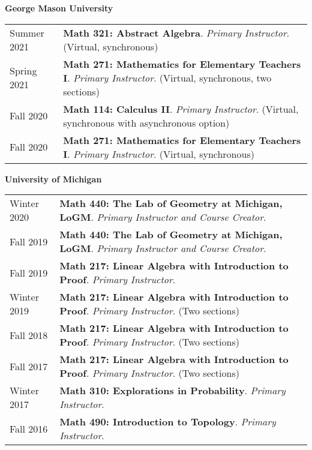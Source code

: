 
    \medskip


    \medskip
    \medskip

    \textbf{\large George Mason University}
    
    \begin{center}
    {
    \renewcommand{\arraystretch}{1.2}
    \begin{longtable}{p{}  p{}}
      Summer 2021 & \textbf{{\normalfont Math 321:} Abstract Algebra}. \textit{Primary Instructor}. (Virtual, synchronous) \\ 
  Spring 2021 & \textbf{{\normalfont Math 271:} Mathematics for Elementary Teachers I}. \textit{Primary Instructor}. (Virtual, synchronous, two sections) \\ 
  Fall 2020 & \textbf{{\normalfont Math 114:} Calculus II}. \textit{Primary Instructor}. (Virtual, synchronous with asynchronous option) \\ 
  Fall 2020 & \textbf{{\normalfont Math 271:} Mathematics for Elementary Teachers I}. \textit{Primary Instructor}. (Virtual, synchronous) 
    \end{longtable}
    } 
    \end{center}

    \vspace{-1em}


    \textbf{\large University of Michigan}
    
    \begin{center}
    {
    \renewcommand{\arraystretch}{1.2}
    \begin{longtable}{p{}  p{}}
      Winter 2020 & \textbf{{\normalfont Math 440:} The Lab of Geometry at Michigan, LoGM}. \textit{Primary Instructor and Course Creator}.  \\ 
  Fall 2019 & \textbf{{\normalfont Math 440:} The Lab of Geometry at Michigan, LoGM}. \textit{Primary Instructor and Course Creator}.  \\ 
  Fall 2019 & \textbf{{\normalfont Math 217:} Linear Algebra with Introduction to Proof}. \textit{Primary Instructor}.  \\ 
  Winter 2019 & \textbf{{\normalfont Math 217:} Linear Algebra with Introduction to Proof}. \textit{Primary Instructor}. (Two sections) \\ 
  Fall 2018 & \textbf{{\normalfont Math 217:} Linear Algebra with Introduction to Proof}. \textit{Primary Instructor}. (Two sections) \\ 
  Fall 2017 & \textbf{{\normalfont Math 217:} Linear Algebra with Introduction to Proof}. \textit{Primary Instructor}. (Two sections) \\ 
  Winter 2017 & \textbf{{\normalfont Math 310:} Explorations in Probability}. \textit{Primary Instructor}.  \\ 
  Fall 2016 & \textbf{{\normalfont Math 490:} Introduction to Topology}. \textit{Primary Instructor}.  
    \end{longtable}
    } 
    \end{center}

